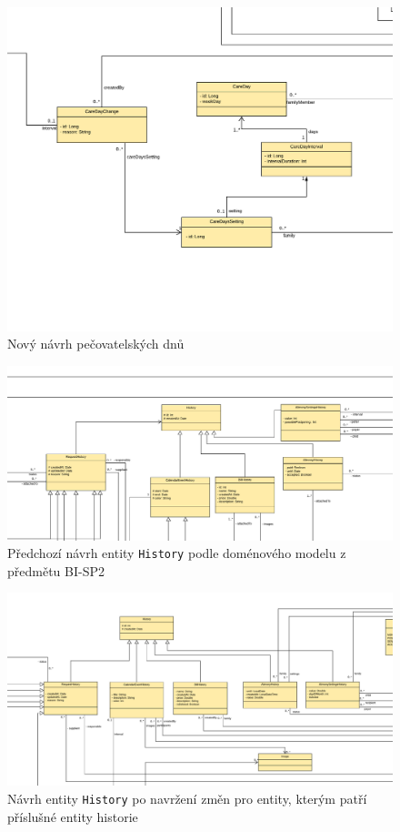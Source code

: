     \begin{figure}\centering
	       \includegraphics[angle=90, height=1.0\textheight]{pdfs/CareDays2}
	       \caption[Nový návrh pečovatelských dnů]{Nový návrh pečovatelských dnů}\label{image:caredays2}
        \end{figure}
    \begin{figure}\centering
        \includegraphics[angle=90, height=1.0\textheight]{pdfs/History1}
        \caption[Předešlý návrh entity \texttt{History}]{Předchozí návrh entity \texttt{History} podle doménového modelu z předmětu BI-SP2}\label{image:History1}
    \end{figure}
    \begin{figure}\centering
        \includegraphics[angle=90, height=1.0\textheight]{pdfs/History1_2}
        \caption[Návrh entity \texttt{History} po změnách návrhu]{Návrh entity \texttt{History} po navržení změn pro entity, kterým patří příslušné entity historie}\label{image:History1_2}
    \end{figure}

